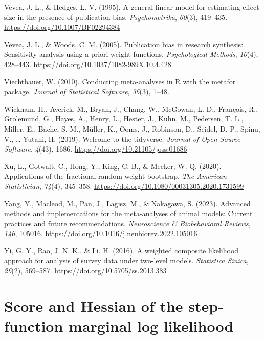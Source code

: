 \documentclass[
  man, donotrepeattitle,floatsintext]{apa7}
\newlength{\cslhangindent}
\newenvironment{CSLReferences}[2] %
 {\begin{list}{}{%
  \setlength{\itemindent}{0pt}
  \setlength{\leftmargin}{0pt}
  \setlength{\parsep}{0pt}
  \ifodd #1
   \setlength{\leftmargin}{\cslhangindent}
   \setlength{\itemindent}{-1\cslhangindent}
  \fi
  \setlength{\itemsep}{#2\baselineskip}}}
 {\end{list}}
\begin{document}
\begin{CSLReferences}{1}{0}
Vevea, J. L., \& Hedges, L. V. (1995). A general linear model for estimating effect size in the presence of publication bias. \emph{Psychometrika}, \emph{60}(3), 419--435. \url{https://doi.org/10.1007/BF02294384}

Vevea, J. L., \& Woods, C. M. (2005). Publication bias in research synthesis: Sensitivity analysis using a priori weight functions. \emph{Psychological Methods}, \emph{10}(4), 428--443. \url{https://doi.org/10.1037/1082-989X.10.4.428}

Viechtbauer, W. (2010). {Conducting meta-analyses in R with the metafor package}. \emph{Journal of Statistical Software}, \emph{36}(3), 1--48.

Wickham, H., Averick, M., Bryan, J., Chang, W., McGowan, L. D., François, R., Grolemund, G., Hayes, A., Henry, L., Hester, J., Kuhn, M., Pedersen, T. L., Miller, E., Bache, S. M., Müller, K., Ooms, J., Robinson, D., Seidel, D. P., Spinu, V., \ldots{} Yutani, H. (2019). Welcome to the {tidyverse}. \emph{Journal of Open Source Software}, \emph{4}(43), 1686. \url{https://doi.org/10.21105/joss.01686}

Xu, L., Gotwalt, C., Hong, Y., King, C. B., \& Meeker, W. Q. (2020). Applications of the fractional-random-weight bootstrap. \emph{The American Statistician}, \emph{74}(4), 345--358. \url{https://doi.org/10.1080/00031305.2020.1731599}

Yang, Y., Macleod, M., Pan, J., Lagisz, M., \& Nakagawa, S. (2023). Advanced methods and implementations for the meta-analyses of animal models: {Current} practices and future recommendations. \emph{Neuroscience \& Biobehavioral Reviews}, \emph{146}, 105016. \url{https://doi.org/10.1016/j.neubiorev.2022.105016}

Yi, G. Y., Rao, J. N. K., \& Li, H. (2016). A weighted composite likelihood approach for analysis of survey data under two-level models. \emph{Statistica Sinica}, \emph{26}(2), 569--587. \url{https://doi.org/10.5705/ss.2013.383}

\end{CSLReferences}

\endgroup

\appendix


\section{Score and Hessian of the step-function marginal log likelihood}\label{CML-derivatives}
\end{document}
